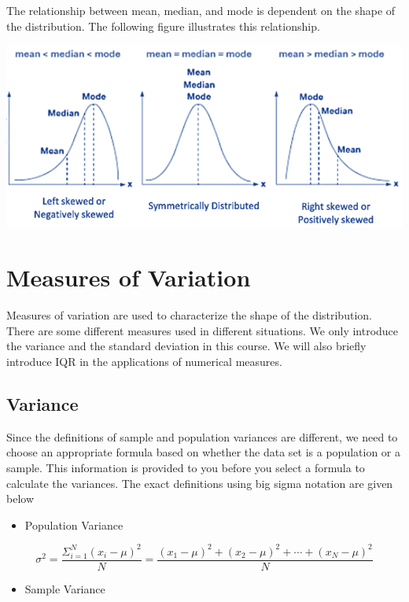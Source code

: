\documentclass[
]{book}
\providecommand{\tightlist}{%
  \setlength{\itemsep}{0pt}\setlength{\parskip}{0pt}}
\begin{document}
The relationship between mean, median, and mode is dependent on the shape of the distribution. The following figure illustrates this relationship.

\begin{center}\includegraphics[width=0.7\linewidth]{week02/skewness} \end{center}

\hypertarget{measures-of-variation}{%
\section{Measures of Variation}\label{measures-of-variation}}

Measures of variation are used to characterize the shape of the distribution. There are some different measures used in different situations. We only introduce the variance and the standard deviation in this course. We will also briefly introduce IQR in the applications of numerical measures.

\hypertarget{variance}{%
\subsection{Variance}\label{variance}}

Since the definitions of sample and population variances are different, we need to choose an appropriate formula based on whether the data set is a population or a sample. This information is provided to you before you select a formula to calculate the variances. The exact definitions using big sigma notation are given below

\begin{itemize}
\tightlist
\item
  Population Variance
\end{itemize}

\[
\sigma^2 = \frac{\Sigma_{i=1}^N (x_i-\mu)^2}{N}=\frac{(x_1-\mu)^2 + (x_2-\mu)^2+\cdots+(x_N-\mu)^2}{N}
\]

\begin{itemize}
\tightlist
\item
  Sample Variance
\end{itemize}
\end{document}
